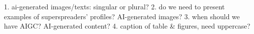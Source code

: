 1. ai-generated images/texts: singular or plural?
2. do we need to present examples of superspreaders' profiles? AI-generated images?
3. when should we have AIGC? AI-generated content? 
4. caption of table & figures, need uppercase?